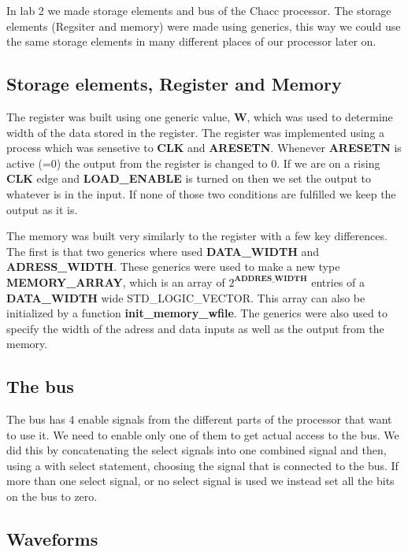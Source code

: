In lab 2 we made storage elements and bus of the Chacc processor. The storage
elements (Regsiter and memory) were made using generics, this way we could use
the same storage elements in many different places of our processor later on.
\subsection*{Storage elements, Register and Memory}
The register was built using one generic value, \textbf{W}, which was used to
determine width of the data stored in the register. The register was implemented
using a process which was sensetive to \textbf{CLK} and \textbf{ARESETN}.
Whenever \textbf{ARESETN} is active (=0) the output from the register is changed
to 0. If we are on a rising \textbf{CLK} edge and \textbf{LOAD\_ENABLE} is
turned on then we set the output to whatever is in the input. If none of those
two conditions are fulfilled we keep the output as it is.

The memory was built very similarly to the register with a few key differences.
The first is that two generics where used \textbf{DATA\_WIDTH} and
\textbf{ADRESS\_WIDTH}. These generics were used to make a new type
\textbf{MEMORY\_ARRAY}, which is an array of $2^{\textbf{ADDRES\_WIDTH}}$
entries of a \\ \textbf{DATA\_WIDTH} wide STD\_LOGIC\_VECTOR. This array can also
be initialized by a function \textbf{init\_memory\_wfile}. The generics were
also used to specify the width of the adress and data inputs as well as the
output from the memory.
\subsection*{The bus}
The bus has 4 enable signals from the different parts of the processor that want
to use it. We need to enable only one of them to get actual access to the bus.
We did this by concatenating the select signals into one combined signal and
then, using a with select statement, choosing the signal that is connected to
the bus. If more than one select signal, or no select signal is used we instead
set all the bits on the bus to zero.
\subsection*{Waveforms}